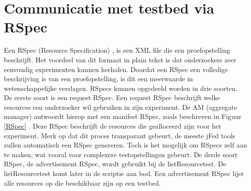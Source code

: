 \section{Communicatie met testbed via RSpec}
\npar
Een RSpec (Resource Specification) , is een XML file die een proefopstelling beschrijft\citep{geni-RSpec}. Het voordeel van dit formaat in plain tekst is dat onderzoekers zeer eenvoudig experimenten kunnen herhalen. Doordat een RSpec een volledige beschrijving is van een proefopstelling, is dit een meerwaarde in wetenschappelijke verslagen.
RSpecs kunnen opgedeeld worden in drie soorten. 
\npar
De eerste soort is een request RSpec. Een request RSpec beschrijft welke resources een onderzoeker wil gebruiken in zijn experiment. De AM (aggregate manager) antwoordt hierop met een manifest RSpec, zoals beschreven in Figuur \ref{RSpec} . Deze RSpec beschrijft de resources die gealloceerd zijn voor het experiment. Merk op dat dit proces transparant gebeurt, de meeste jFed tools zullen automatisch een RSpec genereren. Toch is het mogelijk om RSpecs zelf aan te maken, wat vooral voor complexere testopstellingen gebeurt.
\npar
De derde soort RSpec, de advertisement RSpec, wordt gebruikt bij de listResourcetest. De listResourcetest komt later in de scriptie aan bod. Een advertisement RSpec lijst alle resources op die beschikbaar zijn op een testbed.